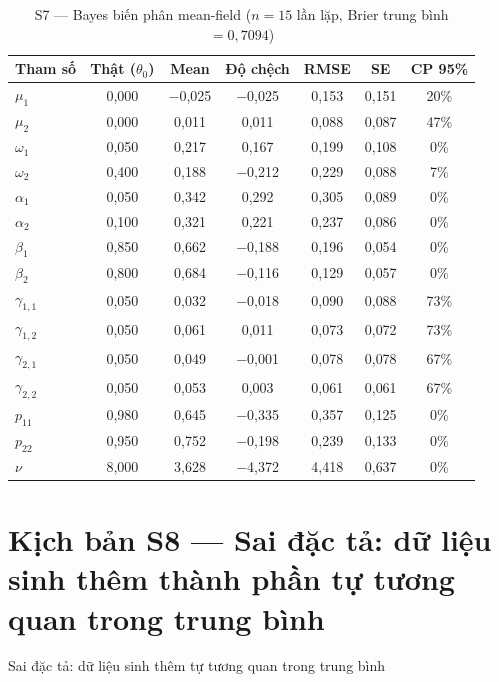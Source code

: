 \documentclass[11pt,a4paper]{article}
\begin{document}
\begin{table}[H]\centering\scriptsize
\caption{S7 --- Bayes biến phân mean-field ($n=15$ lần lặp, Brier trung bình $=0{,}7094$)}
\begin{tabularx}{\textwidth}{l C C C C C C}
\toprule
\textbf{Tham số} & \textbf{Thật ($\theta_0$)} & \textbf{Mean} & \textbf{Độ chệch} & \textbf{RMSE} & \textbf{SE} & \textbf{CP 95\%} \\
\midrule
$\mu_1$ & 0{,}000 & $-$0{,}025 & $-$0{,}025 & 0{,}153 & 0{,}151 & 20\% \\
$\mu_2$ & 0{,}000 & 0{,}011 & 0{,}011 & 0{,}088 & 0{,}087 & 47\% \\
$\omega_1$ & 0{,}050 & 0{,}217 & 0{,}167 & 0{,}199 & 0{,}108 & 0\% \\
$\omega_2$ & 0{,}400 & 0{,}188 & $-$0{,}212 & 0{,}229 & 0{,}088 & 7\% \\
$\alpha_1$ & 0{,}050 & 0{,}342 & 0{,}292 & 0{,}305 & 0{,}089 & 0\% \\
$\alpha_2$ & 0{,}100 & 0{,}321 & 0{,}221 & 0{,}237 & 0{,}086 & 0\% \\
$\beta_1$ & 0{,}850 & 0{,}662 & $-$0{,}188 & 0{,}196 & 0{,}054 & 0\% \\
$\beta_2$ & 0{,}800 & 0{,}684 & $-$0{,}116 & 0{,}129 & 0{,}057 & 0\% \\
$\gamma_{1,1}$ & 0{,}050 & 0{,}032 & $-$0{,}018 & 0{,}090 & 0{,}088 & 73\% \\
$\gamma_{1,2}$ & 0{,}050 & 0{,}061 & 0{,}011 & 0{,}073 & 0{,}072 & 73\% \\
$\gamma_{2,1}$ & 0{,}050 & 0{,}049 & $-$0{,}001 & 0{,}078 & 0{,}078 & 67\% \\
$\gamma_{2,2}$ & 0{,}050 & 0{,}053 & 0{,}003 & 0{,}061 & 0{,}061 & 67\% \\
$p_{11}$ & 0{,}980 & 0{,}645 & $-$0{,}335 & 0{,}357 & 0{,}125 & 0\% \\
$p_{22}$ & 0{,}950 & 0{,}752 & $-$0{,}198 & 0{,}239 & 0{,}133 & 0\% \\
$\nu$ & 8{,}000 & 3{,}628 & $-$4{,}372 & 4{,}418 & 0{,}637 & 0\% \\
\bottomrule
\end{tabularx}
\end{table}

\bigskip
\section*{Kịch bản S8 --- Sai đặc tả: dữ liệu sinh thêm thành phần tự tương quan trong trung bình}
Sai đặc tả: dữ liệu sinh thêm tự tương quan trong trung bình
\end{document}
